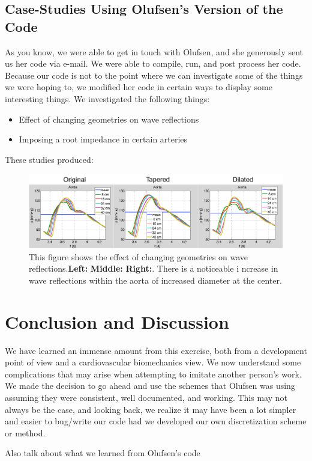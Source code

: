 \documentclass[12pt]{article}
\begin{document}
\pagebreak

\subsection{Case-Studies Using Olufsen's Version of the Code}
As you know, we were able to get in touch with Olufsen, and she generously sent us her code via e-mail. We were able to compile, run, and post process her code. Because our code is not to the point where we can investigate some of the things we were hoping to, we modified her code in certain ways to display some interesting things. We investigated the following things:

\begin{itemize}
	\item
		Effect of changing geometries on wave reflections
	\item
		Imposing a root impedance in certain arteries
\end{itemize}

These studies produced:


\begin{figure}
	\centering
	\label{aorta}
		\includegraphics[width=6.5in]{aortawavereflections}
		\caption{This figure shows the effect of changing geometries on wave reflections.\textbf{Left:} \textbf{Middle:} \textbf{Right:}. There is a noticeable i			ncrease in wave reflections within the aorta of increased diameter at the center.}
\end{figure}

\begin{figure}
	\label{rootimpedance}
\end{figure}

\section{Conclusion and Discussion}
We have learned an immense amount from this exercise, both from a development point of view and a cardiovascular biomechanics view. We now understand some complications that may arise when attempting to imitate another person's work. We made the decision to go ahead and use the schemes that Olufsen was using assuming they were consistent, well documented, and working. This may not always be the case, and looking back, we realize it may have been a lot simpler and easier to bug/write our code had we developed our own discretization scheme or method. 

Also talk about what we learned from Olufsen's code



\end{document}

